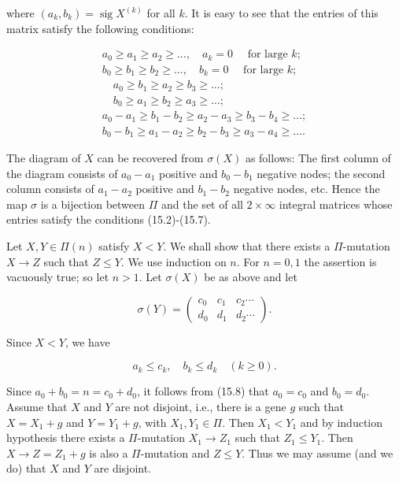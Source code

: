 \documentclass[10pt]{article}
\begin{document}
where $\left(a_{k}, b_{k}\right)=\operatorname{sig} X^{(k)}$ for all $k$. It is easy to see that the entries of this matrix satisfy the following conditions:


\begin{gather*}
a_{0} \geqslant a_{1} \geqslant a_{2} \geqslant \ldots, \quad a_{k}=0 \quad \text { for large } k ;  \tag{15.2}\\
b_{0} \geqslant b_{1} \geqslant b_{2} \geqslant \ldots, \quad b_{k}=0 \quad \text { for large } k ;  \tag{15.3}\\
\quad a_{0} \geqslant b_{1} \geqslant a_{2} \geqslant b_{3} \geqslant \ldots ;  \tag{15.4}\\
\quad b_{0} \geqslant a_{1} \geqslant b_{2} \geqslant a_{3} \geqslant \ldots ;  \tag{15.5}\\
a_{0}-a_{1} \geqslant b_{1}-b_{2} \geqslant a_{2}-a_{3} \geqslant b_{3}-b_{4} \geqslant \ldots ;  \tag{15.6}\\
b_{0}-b_{1} \geqslant a_{1}-a_{2} \geqslant b_{2}-b_{3} \geqslant a_{3}-a_{4} \geqslant \ldots . \tag{15.7}
\end{gather*}


The diagram of $X$ can be recovered from $\sigma(X)$ as follows: The first column of the diagram consists of $a_{0}-a_{1}$ positive and $b_{0}-b_{1}$ negative nodes; the second column consists of $a_{1}-a_{2}$ positive and $b_{1}-b_{2}$ negative nodes, etc. Hence the map $\sigma$ is a bijection between $\Pi$ and the set of all $2 \times \infty$ integral matrices whose entries satisfy the conditions (15.2)-(15.7).

Let $X, Y \in \Pi(n)$ satisfy $X<Y$. We shall show that there exists a $\Pi$-mutation $X \rightarrow Z$ such that $Z \leqslant Y$. We use induction on $n$. For $n=0,1$ the assertion is vacuously true; so let $n>1$. Let $\sigma(X)$ be as above and let

$$
\sigma(Y)=\left(\begin{array}{lll}
c_{0} & c_{1} & c_{2} \cdots \\
d_{0} & d_{1} & d_{2} \cdots
\end{array}\right) .
$$

Since $X<Y$, we have


\begin{equation*}
a_{k} \leqslant c_{k}, \quad b_{k} \leqslant d_{k} \quad(k \geqslant 0) . \tag{15.8}
\end{equation*}


Since $a_{0}+b_{0}=n=c_{0}+d_{0}$, it follows from (15.8) that $a_{0}=c_{0}$ and $b_{0}=d_{0}$.\\
Assume that $X$ and $Y$ are not disjoint, i.e., there is a gene $g$ such that $X=X_{1}+g$ and $Y=Y_{1}+g$, with $X_{1}, Y_{1} \in \Pi$. Then $X_{1}<Y_{1}$ and by induction hypothesis there exists a $\Pi$-mutation $X_{1} \rightarrow Z_{1}$ such that $Z_{1} \leqslant Y_{1}$. Then $X \rightarrow Z=Z_{1}+g$ is also a $\Pi$-mutation and $Z \leqslant Y$. Thus we may assume (and we do) that $X$ and $Y$ are disjoint.
\end{document}
